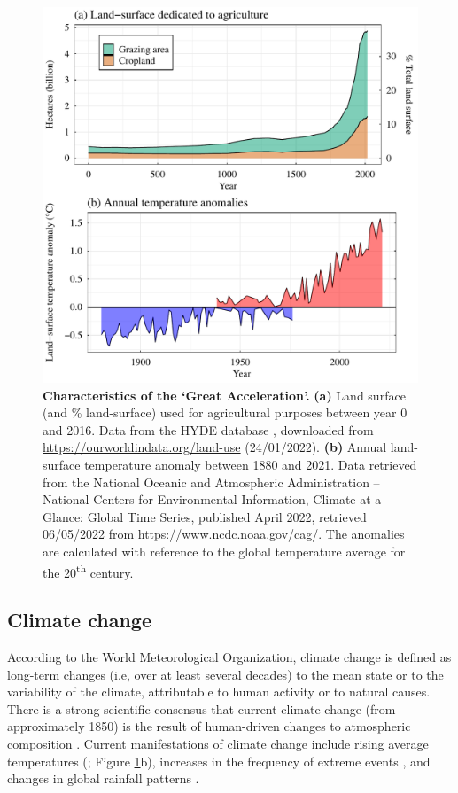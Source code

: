 \begin{figure}[h!]
\centering
\includegraphics[scale=0.55]{figures/Chapter1/Intro_plot}
\caption[Characteristics of the `Great Acceleration']{\textbf{Characteristics of the `Great Acceleration'.} \textbf{(a)} Land surface (and \% land-surface) used for agricultural purposes between year 0 and 2016. Data from the HYDE database \citep{Goldewijk2017}, downloaded from \url{https://ourworldindata.org/land-use} (24/01/2022). \textbf{(b)} Annual land-surface temperature anomaly between 1880 and 2021. Data retrieved from the National Oceanic and Atmospheric Administration – National Centers for Environmental Information, Climate at a Glance: Global Time Series, published April 2022, retrieved 06/05/2022 from \url{https://www.ncdc.noaa.gov/cag/}. The anomalies are calculated with reference to the global temperature average for the 20\textsuperscript{th} century. }
\label{Introduction_fig1}
\end{figure}

\subsection{Climate change}

According to the World Meteorological Organization, climate change is defined as long-term changes (i.e, over at least several decades) to the mean state or to the variability of the climate, attributable to human activity or to natural causes. There is a strong scientific consensus that current climate change (from approximately 1850) is the result of human-driven changes to atmospheric composition \citep{Crowley2000, IPCC2013, Maibach2014}. Current manifestations of climate change include rising average temperatures (\citet{Valipour2021}; Figure \ref{Introduction_fig1}b), increases in the frequency of extreme events \citep{Seneviratne2012}, and changes in global rainfall patterns \citep{Dore2005, Trenberth2011}. 

